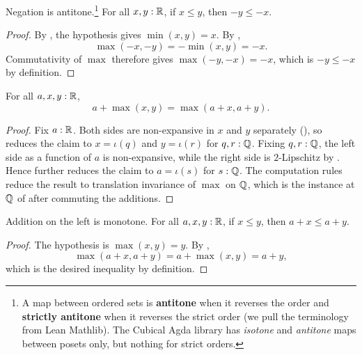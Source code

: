 \begin{lemma}
  \label{negFlipLeReal}
  Negation is antitone.\footnote{A map between ordered sets is \textbf{antitone} when it reverses the order and \textbf{strictly antitone} when it reverses the strict order (we pull the terminology from Lean Mathlib). The Cubical Agda library has \emph{isotone} and \emph{antitone} maps between posets only, but nothing for strict orders.} For all $x, y : \mathbb{R}$, if $x \le y$, then $-y \le -x$.
\end{lemma}
\begin{proof}
  By , the hypothesis gives $\min(x,y)=x$. By ,
  \[
    \max(-x,-y)=-\min(x,y)=-x.
  \]
  Commutativity of $\max$ therefore gives $\max(-y,-x)=-x$, which is $-y\le -x$ by definition.
\end{proof}

\begin{lemma}
  \label{plusDistRMaxReal}
  For all $a,x,y : \mathbb{R}$,
  \[
    a+\max(x,y)=\max(a+x,a+y).
  \]
\end{lemma}
\begin{proof}
  Fix $a : \mathbb{R}$. Both sides are non-expansive in $x$ and $y$ separately (), so  reduces the claim to $x=\iota(q)$ and $y=\iota(r)$ for $q, r : \mathbb{Q}$. Fixing $q,r : \mathbb{Q}$, the left side as a function of $a$ is non-expansive, while the right side is $2$-Lipschitz by . Hence  further reduces the claim to $a=\iota(s)$ for $s : \mathbb{Q}$. The computation rules reduce the result to translation invariance of $\max$ on $\mathbb{Q}$, which is the instance at $\mathbb{Q}$ of  after commuting the additions.
\end{proof}


\begin{lemma}
  \label{plusMonoLLeReal}
  Addition on the left is monotone. For all $a,x,y : \mathbb{R}$, if $x\le y$, then $a+x\le a+y$.
\end{lemma}
\begin{proof}
  The hypothesis is $\max(x,y)=y$. By ,
  \[
    \max(a+x,a+y)=a+\max(x,y)=a+y,
  \]
  which is the desired inequality by definition.
\end{proof}

